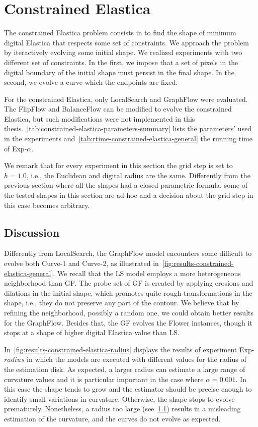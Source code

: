 \section{Constrained Elastica}

The constrained Elastica problem consists in to find the shape of minimum digital Elastica that respects some set of constraints. We approach the problem by iteractively evolving some initial shape. We realized experiments with two different set of constraints. In the first, we impose that a set of pixels in the digital boundary of the initial shape must persist in the final shape. In the second, we evolve a curve which the endpoints are fixed. 

For the constrained Elastica, only LocalSearch and GraphFlow were evaluated. The FlipFlow and BalanceFlow can be modified to evolve the constrained Elastica, but such modifications were not implemented in this thesis.~\cref{tab:constrained-elastica-parameters-summary} lists the parameters' used in the experiments and~\cref{tab:rtime-constrained-elastica-general} the running time of Exp-$\alpha$.

We remark that for every experiment in this section the grid step is set to $h=1.0$, i.e., the Euclidean and digital radius are the same. Differently from the previous section where all the shapes had a closed parametric formula, some of the tested shapes in this section are ad-hoc and a decision about the grid step in this case becomes arbitrary.

\subsection{Discussion}

Differently from LocalSearch, the GraphFlow model encounters some difficult to evolve both Curve-1 and Curve-2, as illustrated in~\cref{fig:results-constrained-elastica-general}. We recall that the LS model employs a more heterogeneous neighborhood than GF. The probe set of GF is created by applying erosions and dilations in the initial shape, which promotes quite rough transformations in the shape, i.e., they do not preserve any part of the contour. We believe that by refining the neighborhood, possibly a random one, we could obtain better results for the GraphFlow. Besides that, the GF evolves the Flower instances, though it stops at a shape of higher digital Elastica value than LS.

In~\cref{fig:results-constrained-elastica-radius} displays the results of experiment Exp-$radius$ in which the models are executed with different values for the radius of the estimation disk. As expected, a larger radius can estimate a large range of curvature values and it is particular important in the case where $\alpha=0.001$. In this case the shape tends to grow and the estimator should be precise enough to identify small variations in curvature. Otherwise, the shape stops to evolve prematurely. Nonetheless, a radius too large (see~\ref{}) results in a misleading estimation of the curvature, and the curves do not evolve as expected.


